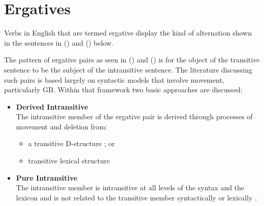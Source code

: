 \chapter{Ergatives}
\label{ergatives}

Verbs in English that are termed ergative display the kind of
alternation shown in the sentences in () and () below.


The pattern of ergative pairs as seen in () and () is 
for the object of the transitive sentence to be the subject of the 
intransitive sentence.  The literature discussing such pairs is based 
largely on syntactic models that involve movement, particularly GB.  
Within that framework two basic approaches are discussed:

\begin{itemize}
\item {\bf Derived Intransitive}\\ The intransitive member of the
ergative pair is derived through processes of movement and deletion from:
\begin{itemize}
\item a transitive D-structure \cite{Burzio86}; or	
\item transitive lexical structure \cite{HaleKeyser86,HaleKeyser87}
\end{itemize}

\item {\bf Pure Intransitive}\\ The intransitive member is intransitive at all levels of the
syntax and the lexicon and is not related to the transitive member
syntactically or lexically \cite{Napoli88}.
\end{itemize}


